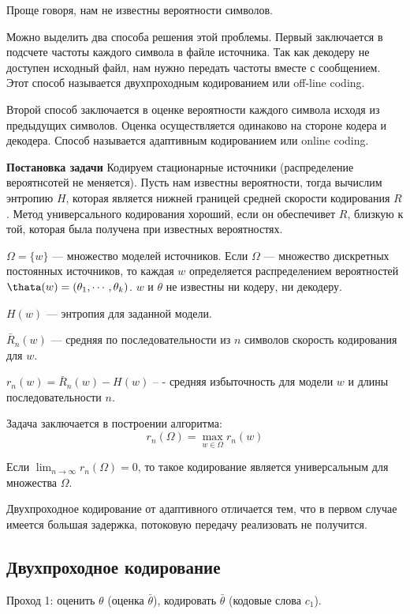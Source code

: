 {Проще говоря, нам не известны вероятности символов.

Можно выделить два способа решения этой проблемы. Первый заключается в подсчете
частоты каждого символа в файле источника. Так как декодеру не доступен
исходный файл, нам нужно передать частоты вместе с сообщением. Этот способ
называется двухпроходным кодированием или off-line coding.

Второй способ заключается в оценке вероятности каждого символа исходя из
предыдущих символов. Оценка осуществляется одинаково на стороне кодера и
декодера. Способ называется адаптивным кодированием или online coding.

\textbf{Постановка задачи} Кодируем стационарные источники (распределение
вероятнсотей не меняется). Пусть нам известны вероятности, тогда вычислим
энтропию  $H$, которая является нижней границей средней скорости кодирования
$R$. Метод универсального кодирования хороший, если он обеспечивет $R$, близкую
к той, которая была получена при известных вероятностях.

$\Omega = \{w\}$ --- множество моделей источников. Если $\Omega$ --- множество
дискретных постоянных источников, то каждая $w$ определяется распределением
вероятностей $\thata(w) = (\theta_1, \cdots, \theta_k)$. $w$ и $\theta$ не
известны ни кодеру, ни декодеру.

$H(w)$ --- энтропия для заданной модели.

$\bar R_n(w)$ --- средняя по последовательности из $n$ символов скорость
кодирования для $w$.

$r_n(w) = \bar R_n(w) - H(w)$ -- - средняя избыточность для модели $w$ и длины
последовательности $n$.

Задача заключается в построении алгоритма:
\[
    r_n(\Omega) = \max_{w \in \Omega} r_n(w)
\]

Если $\lim_{n \to \infty} r_n(\Omega) = 0$, то такое кодирование является
универсальным для множества $\Omega$.

Двухпроходное кодирование от адаптивного отличается тем, что в первом случае
имеется большая задержка, потоковую передачу реализовать не получится.

\subsection{Двухпроходное кодирование}

Проход 1: оценить $\theta$ (оценка $\bar \theta$), кодировать $\bar \theta$
(кодовые слова $c_1$).

}
